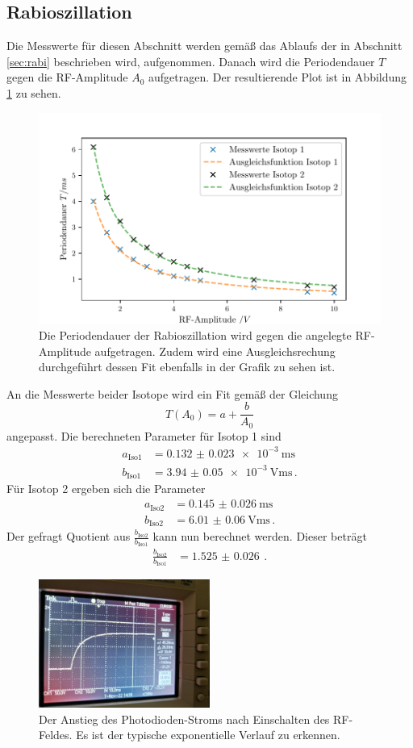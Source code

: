 \subsection{Rabioszillation}
Die Messwerte für diesen Abschnitt werden gemäß das Ablaufs der in Abschnitt \ref{sec:rabi} beschrieben wird, aufgenommen.
Danach wird die Periodendauer $T$ gegen die RF-Amplitude $A_0$ aufgetragen.
Der resultierende Plot ist in Abbildung \ref{fig:rabi} zu sehen.
\begin{figure}
    \centering
    \includegraphics[width=\textwidth]{content/plots/periodendauer.pdf}
    \caption{Die Periodendauer der Rabioszillation wird gegen die angelegte RF-Amplitude aufgetragen.
    Zudem wird eine Ausgleichsrechung durchgeführt dessen Fit ebenfalls in der Grafik zu sehen ist.}
    \label{fig:rabi}
\end{figure}
An die Messwerte beider Isotope wird ein Fit gemäß der Gleichung 
\begin{equation*}
    T(A_0) = a + \frac{b}{A_0}
\end{equation*}
angepasst.
Die berechneten Parameter für Isotop 1 sind 
\begin{align*}
    a_\text{Iso1} &= \SI{0.132(23)e-3}{\ms}\\
    b_\text{Iso1} &= \SI{3.94(5)e-3}{\V\ms} \, .
\end{align*}
Für Isotop 2 ergeben sich die Parameter 
\begin{align*}
    a_\text{Iso2} &= \SI{0.145(26)}{\ms}\\
    b_\text{Iso2} &= \SI{6.01(6)}{\V\ms} \, .
\end{align*}
Der gefragt Quotient aus $\frac{b_\text{Iso2}}{b_\text{Iso1}}$ kann nun berechnet werden.
Dieser beträgt 
\begin{align*}
    \frac{b_\text{Iso2}}{b_\text{Iso1}} &= \SI{1.525(26)}{} \, .
\end{align*}
\begin{figure}
    \centering
    \includegraphics[width=0.5\textwidth]{Data/anstieg.jpeg}
    \caption{Der Anstieg des Photodioden-Stroms nach Einschalten des RF-Feldes.
    Es ist der typische exponentielle Verlauf zu erkennen.}
\end{figure}